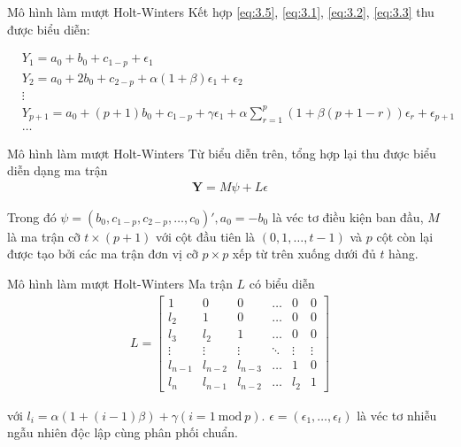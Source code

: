 \begin{frame}{Mô hình làm mượt Holt-Winters}
    Kết hợp \ref{eq:3.5}, \ref{eq:3.1}, \ref{eq:3.2}, \ref{eq:3.3} thu được biểu diễn:

    \begin{align*}
        &Y_1 = a_0 + b_0 + c_{1-p} + \epsilon_1  \\
        &Y_2 = a_0 + 2b_0 + c_{2-p} + \alpha\left(1+\beta\right)\epsilon_1 +  \epsilon_2  \\
        & \vdots \\
        & Y_{p+1} = a_0 + \left(p + 1\right)b_0 + c_{1-p} + \gamma \epsilon_1 + \alpha \sum_{r= 1}^p \left(1 + \beta\left(p+1-r\right)\right)\epsilon_r + \epsilon_{p+1} \\
        &\dots
    \end{align*}
\end{frame}


\begin{frame}{Mô hình làm mượt Holt-Winters}
      Từ biểu diễn trên, tổng hợp lại thu được biểu diễn dạng ma trận
    \begin{align}
        \textbf{Y} = M \psi + L \epsilon         
    \end{align}
    
    Trong đó $\psi = \left(b_0, c_{1-p}, c_{2-p}, \dots, c_0\right)', a_0 = -b_0$ là véc tơ điều kiện ban đầu, $M$ là ma trận cỡ $t \times \left(p+1\right)$ với cột đầu tiên là $\left(0,1, \dots,t-1 \right)$ và $p$ cột còn lại được tạo bởi các ma trận đơn vị cỡ $p \times p$ xếp từ trên xuống dưới đủ $t$ hàng.  
\end{frame}

\begin{frame}{Mô hình làm mượt Holt-Winters}
     Ma trận $L$ có biểu diễn
    \begin{align}
        L = \begin{bmatrix}
        1 & 0 & 0 & \dots & 0  & 0\\
        l_2 & 1 & 0 & \dots & 0  & 0\\
        l_3 & l_2 & 1 & \dots & 0  &0\\
        \vdots& \vdots& \vdots& \ddots&\vdots &\vdots\\
        l_{n-1} & l_{n-2} & l_{n-3} & \dots& 1 & 0\\
        l_n& l_{n-1}& l_{n-2}&\dots&l_2&1
        \end{bmatrix}
    \end{align}
    
    với $l_i = \alpha\left(1 + \left(i-1\right)\beta\right) + \gamma\left(i = 1 \ \text{mod} \ p \right)$. $\epsilon = \left(\epsilon_1, \dots, \epsilon_t\right)$ là véc tơ nhiễu ngẫu nhiên độc lập cùng phân phối chuẩn.
\end{frame}


